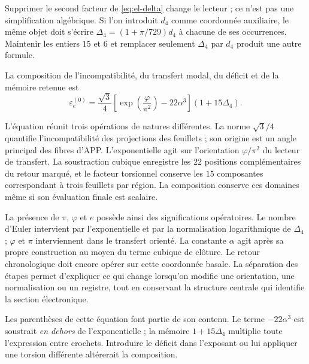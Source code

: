 \begin{remark}
Supprimer le second facteur de \eqref{eq:el-delta} change le lecteur ; ce n'est pas une simplification algébrique. Si l'on introduit \(d_4\) comme coordonnée auxiliaire, le même objet doit s'écrire \(\Delta_4=(1+\pi/729)d_4\) à chacune de ses occurrences. Maintenir les entiers \(15\) et \(6\) et remplacer seulement \(\Delta_4\) par \(d_4\) produit une autre formule.
\end{remark}

\begin{definition}
La composition de l'incompatibilité, du transfert modal, du déficit et de la mémoire retenue
est
\begin{equation}
 \varepsilon_e^{(0)}
 =\frac{\sqrt3}{4}
  \left[\exp\!\left(\frac{\varphi}{\pi^2}\right)-22\alpha^3\right]
  (1+15\Delta_4).
 \label{eq:el-basal}
\end{equation}
\end{definition}

L'équation réunit trois opérations de natures différentes. La norme
\(\sqrt3/4\) quantifie l'incompatibilité des projections des
feuillets ; son origine est un angle principal des fibres d'APP.
L'exponentielle agit sur l'orientation \(\varphi/\pi^2\) du
lecteur de transfert. La soustraction cubique enregistre les \(22\) positions
complémentaires du retour marqué, et le facteur torsionnel conserve les
\(15\) composantes correspondant à trois feuillets par région. La
composition conserve ces domaines même si son évaluation finale est scalaire.

La présence de \(\pi\), \(\varphi\) et \(e\) possède ainsi des significations
opératoires. Le nombre d'Euler intervient par l'exponentielle et par
la normalisation logarithmique de \(\Delta_4\) ; \(\varphi\) et \(\pi\)
interviennent dans le transfert orienté. La constante \(\alpha\)
agit après sa propre construction au moyen du terme cubique
de clôture. Le retour chronologique doit encore opérer sur cette coordonnée
basale. La séparation des étapes permet d'expliquer ce qui change lorsqu'on modifie
une orientation, une normalisation ou un registre, tout en conservant la structure
centrale qui identifie la section électronique.

Les parenthèses de cette équation font partie de son contenu. Le terme \(-22\alpha^3\) est soustrait \emph{en dehors} de l'exponentielle ; la mémoire \(1+15\Delta_4\) multiplie toute l'expression entre crochets. Introduire le déficit dans l'exposant ou lui appliquer une torsion différente altérerait la composition.

